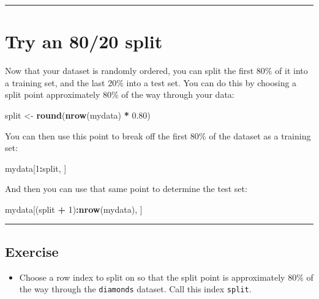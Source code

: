 \documentclass[]{book}
\newenvironment{Shaded}{\begin{snugshade}}{\end{snugshade}}
\newcommand{\KeywordTok}[1]{\textcolor[rgb]{0.13,0.29,0.53}{\textbf{#1}}}
\newcommand{\DecValTok}[1]{\textcolor[rgb]{0.00,0.00,0.81}{#1}}
\newcommand{\FloatTok}[1]{\textcolor[rgb]{0.00,0.00,0.81}{#1}}
\newcommand{\StringTok}[1]{\textcolor[rgb]{0.31,0.60,0.02}{#1}}
\newcommand{\OperatorTok}[1]{\textcolor[rgb]{0.81,0.36,0.00}{\textbf{#1}}}
\newcommand{\NormalTok}[1]{#1}
\providecommand{\tightlist}{%
  \setlength{\itemsep}{0pt}\setlength{\parskip}{0pt}}
\begin{document}
\begin{center}\rule{0.5\linewidth}{\linethickness}\end{center}

\section{Try an 80/20 split}\label{try-an-8020-split}

Now that your dataset is randomly ordered, you can split the first 80\%
of it into a training set, and the last 20\% into a test set. You can do
this by choosing a split point approximately 80\% of the way through
your data:

\begin{Shaded}
\begin{Highlighting}[]
\NormalTok{split <-}\StringTok{ }\KeywordTok{round}\NormalTok{(}\KeywordTok{nrow}\NormalTok{(mydata) }\OperatorTok{*}\StringTok{ }\FloatTok{0.80}\NormalTok{)}
\end{Highlighting}
\end{Shaded}

You can then use this point to break off the first 80\% of the dataset
as a training set:

\begin{Shaded}
\begin{Highlighting}[]
\NormalTok{mydata[}\DecValTok{1}\OperatorTok{:}\NormalTok{split, ]}
\end{Highlighting}
\end{Shaded}

And then you can use that same point to determine the test set:

\begin{Shaded}
\begin{Highlighting}[]
\NormalTok{mydata[(split }\OperatorTok{+}\StringTok{ }\DecValTok{1}\NormalTok{)}\OperatorTok{:}\KeywordTok{nrow}\NormalTok{(mydata), ]}
\end{Highlighting}
\end{Shaded}

\begin{center}\rule{0.5\linewidth}{\linethickness}\end{center}

\subsection*{Exercise}\label{exercise-2}

\begin{itemize}
\tightlist
\item
  Choose a row index to split on so that the split point is
  approximately 80\% of the way through the \texttt{diamonds} dataset.
  Call this index \texttt{split}.
\end{itemize}
\end{document}
